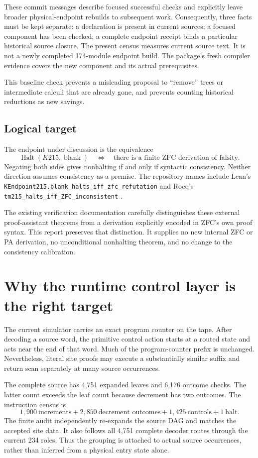 \documentclass[11pt]{article}
\theoremstyle{definition}\newtheorem{definition}[theorem]{Definition}
\theoremstyle{remark}\newtheorem{remark}[theorem]{Remark}
\newcommand{\code}[1]{\nolinkurl{#1}}
\begin{document}
These commit messages describe focused successful checks and explicitly leave broader physical-endpoint rebuilds to subsequent work. Consequently, three facts must be kept separate: a declaration is present in current sources; a focused component has been checked; a complete endpoint receipt binds a particular historical source closure. The present census measures current source text. It is not a newly completed 174-module endpoint build. The package's fresh compiler evidence covers the new component and its actual prerequisites.

This baseline check prevents a misleading proposal to ``remove'' trees or intermediate calculi that are already gone, and prevents counting historical reductions as new savings.

\subsection{Logical target}

The endpoint under discussion is the equivalence
\[
 \operatorname{Halt}(K215,\operatorname{blank})
 \quad\Longleftrightarrow\quad
 \text{there is a finite ZFC derivation of falsity}.
\]
Negating both sides gives nonhalting if and only if syntactic consistency. Neither direction assumes consistency as a premise. The repository names include Lean's
\code{KEndpoint215.blank_halts_iff_zfc_refutation} and Rocq's
\code{tm215_halts_iff_ZFC_inconsistent} \cite{verification}.

The existing verification documentation carefully distinguishes these external proof-assistant theorems from a derivation explicitly encoded in ZFC's own proof syntax. This report preserves that distinction. It supplies no new internal ZFC or PA derivation, no unconditional nonhalting theorem, and no change to the consistency calibration.

\section{Why the runtime control layer is the right target}

The current simulator carries an exact program counter on the tape. After decoding a source word, the primitive control action starts at a routed state and acts near the end of that word. Much of the program-counter prefix is unchanged. Nevertheless, literal site proofs may execute a substantially similar suffix and return scan separately at many source occurrences.

The complete source has 4,751 expanded leaves and 6,176 outcome checks. The latter count exceeds the leaf count because decrement has two outcomes. The instruction census is
\[
 1,900\ \text{increments}
 +2,850\ \text{decrement outcomes}
 +1,425\ \text{controls}
 +1\ \text{halt}.
\]
The finite audit independently re-expands the source DAG and matches the accepted site data. It also follows all 4,751 complete decoder routes through the current 234 roles. Thus the grouping is attached to actual source occurrences, rather than inferred from a physical entry state alone.
\end{document}
